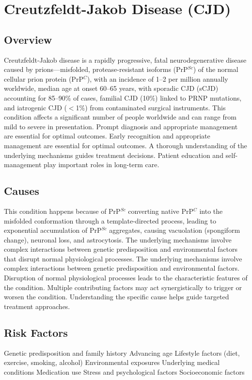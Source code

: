 \chapter{Creutzfeldt-Jakob Disease (CJD)}
\label{sec:Creutzfeldt-Jakob Disease}

\section{Overview}
Creutzfeldt-Jakob disease is a rapidly progressive, fatal neurodegenerative disease caused by prions---misfolded, protease-resistant isoforms (PrP$^{Sc}$) of the normal cellular prion protein (PrP$^{C}$), with an incidence of 1--2 per million annually worldwide, median age at onset 60--65 years, with sporadic CJD (sCJD) accounting for 85--90\% of cases, familial CJD (10\%) linked to PRNP mutations, and iatrogenic CJD ($<$1\%) from contaminated surgical instruments. This condition affects a significant number of people worldwide and can range from mild to severe in presentation. Prompt diagnosis and appropriate management are essential for optimal outcomes. Early recognition and appropriate management are essential for optimal outcomes. A thorough understanding of the underlying mechanisms guides treatment decisions. Patient education and self-management play important roles in long-term care.
\section{Causes}
This condition happens because of PrP$^{Sc}$ converting native PrP$^{C}$ into the misfolded conformation through a template-directed process, leading to exponential accumulation of PrP$^{Sc}$ aggregates, causing vacuolation (spongiform change), neuronal loss, and astrocytosis. The underlying mechanisms involve complex interactions between genetic predisposition and environmental factors that disrupt normal physiological processes. The underlying mechanisms involve complex interactions between genetic predisposition and environmental factors. Disruption of normal physiological processes leads to the characteristic features of the condition. Multiple contributing factors may act synergistically to trigger or worsen the condition. Understanding the specific cause helps guide targeted treatment approaches.
\section{Risk Factors}
Genetic predisposition and family history Advancing age Lifestyle factors (diet, exercise, smoking, alcohol) Environmental exposures Underlying medical conditions Medication use Stress and psychological factors Socioeconomic factors

